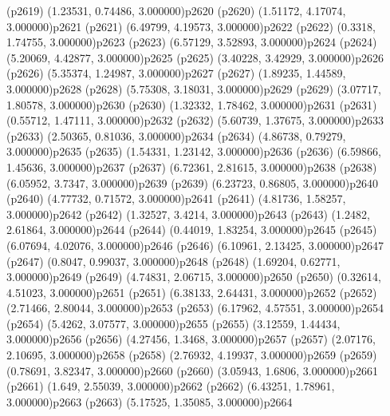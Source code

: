 \psdot(p2619)
\psPoint(1.23531, 0.74486, 3.000000){p2620}
\psdot(p2620)
\psPoint(1.51172, 4.17074, 3.000000){p2621}
\psdot(p2621)
\psPoint(6.49799, 4.19573, 3.000000){p2622}
\psdot(p2622)
\psPoint(0.3318, 1.74755, 3.000000){p2623}
\psdot(p2623)
\psPoint(6.57129, 3.52893, 3.000000){p2624}
\psdot(p2624)
\psPoint(5.20069, 4.42877, 3.000000){p2625}
\psdot(p2625)
\psPoint(3.40228, 3.42929, 3.000000){p2626}
\psdot(p2626)
\psPoint(5.35374, 1.24987, 3.000000){p2627}
\psdot(p2627)
\psPoint(1.89235, 1.44589, 3.000000){p2628}
\psdot(p2628)
\psPoint(5.75308, 3.18031, 3.000000){p2629}
\psdot(p2629)
\psPoint(3.07717, 1.80578, 3.000000){p2630}
\psdot(p2630)
\psPoint(1.32332, 1.78462, 3.000000){p2631}
\psdot(p2631)
\psPoint(0.55712, 1.47111, 3.000000){p2632}
\psdot(p2632)
\psPoint(5.60739, 1.37675, 3.000000){p2633}
\psdot(p2633)
\psPoint(2.50365, 0.81036, 3.000000){p2634}
\psdot(p2634)
\psPoint(4.86738, 0.79279, 3.000000){p2635}
\psdot(p2635)
\psPoint(1.54331, 1.23142, 3.000000){p2636}
\psdot(p2636)
\psPoint(6.59866, 1.45636, 3.000000){p2637}
\psdot(p2637)
\psPoint(6.72361, 2.81615, 3.000000){p2638}
\psdot(p2638)
\psPoint(6.05952, 3.7347, 3.000000){p2639}
\psdot(p2639)
\psPoint(6.23723, 0.86805, 3.000000){p2640}
\psdot(p2640)
\psPoint(4.77732, 0.71572, 3.000000){p2641}
\psdot(p2641)
\psPoint(4.81736, 1.58257, 3.000000){p2642}
\psdot(p2642)
\psPoint(1.32527, 3.4214, 3.000000){p2643}
\psdot(p2643)
\psPoint(1.2482, 2.61864, 3.000000){p2644}
\psdot(p2644)
\psPoint(0.44019, 1.83254, 3.000000){p2645}
\psdot(p2645)
\psPoint(6.07694, 4.02076, 3.000000){p2646}
\psdot(p2646)
\psPoint(6.10961, 2.13425, 3.000000){p2647}
\psdot(p2647)
\psPoint(0.8047, 0.99037, 3.000000){p2648}
\psdot(p2648)
\psPoint(1.69204, 0.62771, 3.000000){p2649}
\psdot(p2649)
\psPoint(4.74831, 2.06715, 3.000000){p2650}
\psdot(p2650)
\psPoint(0.32614, 4.51023, 3.000000){p2651}
\psdot(p2651)
\psPoint(6.38133, 2.64431, 3.000000){p2652}
\psdot(p2652)
\psPoint(2.71466, 2.80044, 3.000000){p2653}
\psdot(p2653)
\psPoint(6.17962, 4.57551, 3.000000){p2654}
\psdot(p2654)
\psPoint(5.4262, 3.07577, 3.000000){p2655}
\psdot(p2655)
\psPoint(3.12559, 1.44434, 3.000000){p2656}
\psdot(p2656)
\psPoint(4.27456, 1.3468, 3.000000){p2657}
\psdot(p2657)
\psPoint(2.07176, 2.10695, 3.000000){p2658}
\psdot(p2658)
\psPoint(2.76932, 4.19937, 3.000000){p2659}
\psdot(p2659)
\psPoint(0.78691, 3.82347, 3.000000){p2660}
\psdot(p2660)
\psPoint(3.05943, 1.6806, 3.000000){p2661}
\psdot(p2661)
\psPoint(1.649, 2.55039, 3.000000){p2662}
\psdot(p2662)
\psPoint(6.43251, 1.78961, 3.000000){p2663}
\psdot(p2663)
\psPoint(5.17525, 1.35085, 3.000000){p2664}
